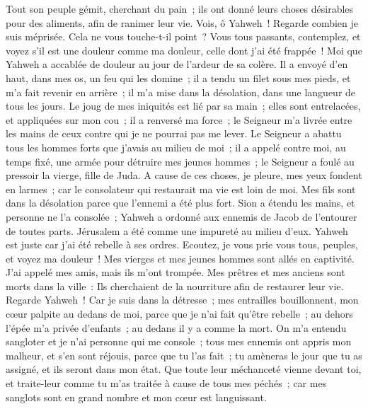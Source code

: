 \begin{multicols}{2}
 Tout son peuple gémit, cherchant du pain~; ils ont donné leurs choses désirables pour des aliments, afin de ranimer leur vie. Vois, ô Yahweh~! Regarde combien je suis méprisée.
 Cela ne vous touche-t-il point~? Vous tous passants, contemplez, et voyez s'il est une douleur comme ma douleur, celle dont j'ai été frappée~! Moi que Yahweh a accablée de douleur au jour de l'ardeur de sa colère.
 Il a envoyé d'en haut, dans mes os, un feu qui les domine~; il a tendu un filet sous mes pieds, et m'a fait revenir en arrière~; il m'a mise dans la désolation, dans une langueur de tous les jours.
 Le joug de mes iniquités est lié par sa main~; elles sont entrelacées, et appliquées sur mon cou~; il a renversé ma force~; le Seigneur m'a livrée entre les mains de ceux contre qui je ne pourrai pas me lever.
 Le Seigneur a abattu tous les hommes forts que j'avais au milieu de moi~; il a appelé contre moi, au temps fixé, une armée pour détruire mes jeunes hommes~; le Seigneur a foulé au pressoir la vierge, fille de Juda.
 A cause de ces choses, je pleure, mes yeux fondent en larmes~; car le consolateur qui restaurait ma vie est loin de moi. Mes fils sont dans la désolation parce que l'ennemi a été plus fort.
 Sion a étendu les mains, et personne ne l'a consolée~; Yahweh a ordonné aux ennemis de Jacob de l'entourer de toutes parts. Jérusalem a été comme une impureté au milieu d'eux.
 Yahweh est juste car j'ai été rebelle à ses ordres. Ecoutez, je vous prie vous tous, peuples, et voyez ma douleur~! Mes vierges et mes jeunes hommes sont allés en captivité.
 J'ai appelé mes amis, mais ils m'ont trompée. Mes prêtres et mes anciens sont morts dans la ville~: Ils cherchaient de la nourriture afin de restaurer leur vie.
 Regarde Yahweh~! Car je suis dans la détresse~; mes entrailles bouillonnent, mon cœur palpite au dedans de moi, parce que je n'ai fait qu'être rebelle~; au dehors l'épée m'a privée d'enfants~; au dedans il y a comme la mort. 
 On m'a entendu sangloter et je n'ai personne qui me console~; tous mes ennemis ont appris mon malheur, et s'en sont réjouis, parce que tu l'as fait~; tu amèneras le jour que tu as assigné, et ils seront dans mon état.
Que toute leur méchanceté vienne devant toi, et traite-leur comme tu m'as traitée à cause de tous mes péchés~; car mes sanglots sont en grand nombre et mon cœur est languissant. 

\end{multicols}
